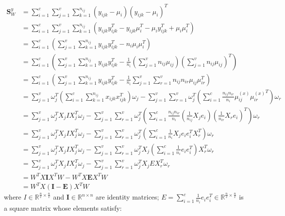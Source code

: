 \begin{appendix}
    \begin{equation}
        \begin{split}
            \boldsymbol{S}^y_W &= \sum_{i=1}^{c}\sum_{j=1}^{v}\sum_{k=1}^{n_{ij}}(y_{ijk}-\mu_i)(y_{ijk}-\mu_i)^T \\
            &= \sum_{i=1}^{c}\sum_{j=1}^{v}\sum_{k=1}^{n_{ij}}\left(y_{ijk}y_{ijk}^T - y_{ijk}\mu_i^T - \mu_iy_{ijk}^T + \mu_i\mu_i^T\right) \\
            &= \sum_{i=1}^{c}\left(\sum_{j=1}^{v}\sum_{k=1}^{n_{ij}}y_{ijk}y_{ijk}^T - n_i\mu_i\mu_i^T\right) \\
            &= \sum_{i=1}^{c}\left(\sum_{j=1}^{v}\sum_{k=1}^{n_{ij}}y_{ijk}y_{ijk}^T - \frac{1}{n_i}\left(\sum_{j=1}^{v}n_{ij}\mu_{ij}\right){\left(\sum_{j=1}^{v}n_{ij}\mu_{ij}\right)}^T\right) \\
            &= \sum_{i=1}^{c}\left(\sum_{j=1}^{v}\sum_{k=1}^{n_{ij}}y_{ijk}y_{ijk}^T - \frac{1}{n_i}\sum_{j=1}^{v}\sum_{r=1}^{v}n_{ij}n_{ir}\mu_{ij}\mu_{ir}^T\right) \\
            &= \sum_{j=1}^{v}\omega_j^T\left(\sum_{i=1}^{c}\sum_{k=1}^{n_{ij}}x_{ijk}x_{ijk}^T\right)\omega_j - \sum_{j=1}^{v}\sum_{r=1}^{v}\omega_j^T\left(\sum_{i=1}^{c}\frac{n_{ij}n_{ir}}{n_i}\mu^{(x)}_{ij}{\mu^{(x)}_{ir}}^T\right)\omega_r \\
            &= \sum_{j=1}^{v}\omega_j^T X_j I X_j^T\omega_j - \sum_{j=1}^{v}\sum_{r=1}^{v}\omega_j^T\left(\sum_{i=1}^{c}\frac{n_{ij}n_{ir}}{n_i}\left(\frac{1}{n_{ij}}X_j e_i\right)\left(\frac{1}{n_{ir}}X_r e_i\right)^T\right)\omega_r \\
            &= \sum_{j=1}^{v}\omega_j^T X_j I X_j^T\omega_j - \sum_{j=1}^{v}\sum_{r=1}^{v}\omega_j^T\left(\sum_{i=1}^{c}\frac{1}{n_i}X_j e_i e_i^T X_r^T\right)\omega_r \\
            &= \sum_{j=1}^{v}\omega_j^T X_j I X_j^T\omega_j - \sum_{j=1}^{v}\sum_{r=1}^{v}\omega_j^T X_j\left(\sum_{i=1}^{c}\frac{1}{n_i}e_i e_i^T\right)X_r^T\omega_r \\
            &= \sum_{j=1}^{v}\omega_j^T X_j I X_j^T\omega_j - \sum_{j=1}^{v}\sum_{r=1}^{v}\omega_j^T X_j E X_r^T\omega_r \\
            &= W^T X \boldsymbol{I} X^T W - W^T X \boldsymbol{E} X^T W \\
            &= W^T X \left(\boldsymbol{I} - \boldsymbol{E}\right) X^T W
        \end{split}
        \label{eq:mvda_Sw_derivation}
    \end{equation}
    where $I \in \mathbb{R}^{\frac{n}{v}\times \frac{n}{v}}$ and $\boldsymbol{I} \in \mathbb{R}^{n\times n}$ are identity matrices; $E = \sum_{i=1}^{c}\frac{1}{n_i}e_i e_i^T \in \mathbb{R}^{\frac{n}{v}\times \frac{n}{v}}$ is a square matrix whose elements satisfy:

\end{appendix}
